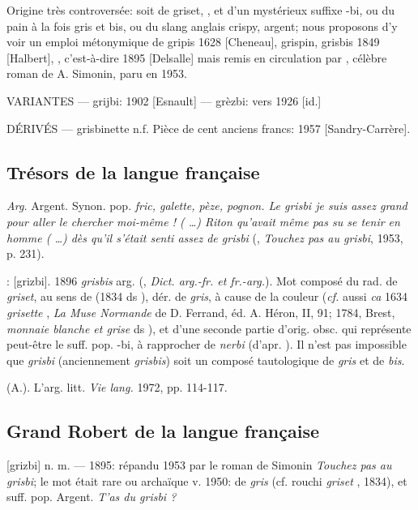 Origine très controversée: soit de griset, , et d'un mystérieux suffixe -bi, ou du pain à la fois gris et bis, ou du slang anglais crispy, argent; nous proposons d'y voir un emploi métonymique de gripis 1628 [Cheneau], grispin, grisbis 1849 [Halbert], , c'est-à-dire  1895 [Delsalle] mais remis en circulation par , célèbre roman de A. Simonin, paru en 1953.

VARIANTES ---  grijbi: 1902 [Esnault] --- grèzbi: vers 1926 [id.]

DÉRIVÉS --- grisbinette n.f. Pièce de cent anciens francs: 1957
[Sandry-Carrère].


\subsection*{Trésors de la langue française}

\emph{Arg.} Argent. Synon. pop. \emph{fric, galette, pèze, pognon. Le grisbi je suis assez grand pour aller le chercher moi-même ! (  \ldots ) Riton qu'avait même pas su se tenir en homme (  \ldots ) dès qu'il s'était senti assez de grisbi} (, \emph{Touchez pas au grisbi}, 1953, p. 231).

: [grizbi].   1896 \emph{grisbis}
arg.  (, \emph{Dict. arg.-fr. et fr.-arg.}). Mot composé du rad. de \emph{griset}, au sens de  (1834 ds ), dér. de \emph{gris}, à cause de la couleur (\emph{cf.} aussi \emph{ca} 1634 \emph{grisette} , \emph{La Muse Normande} de D. Ferrand, éd. A. Héron, II, 91; 1784, Brest, \emph{monnaie blanche et grise} ds ), et d'une seconde partie d'orig. obsc. qui représente peut-être le suff. pop. -bi, à rapprocher de \emph{nerbi}  (d'apr. ). Il n'est pas impossible que \emph{grisbi} (anciennement \emph{grisbis}) soit un composé tautologique de \emph{gris} et de \emph{bis}.

	  (A.). L'arg. litt. \emph{Vie lang.} 1972, pp. 114-117.


\subsection*{Grand Robert de la langue française}

[grizbi] n. m. --- 1895: répandu 1953 par le roman de Simonin \emph{Touchez pas au grisbi}; le mot était rare ou archaïque v. 1950: de \emph{gris}  (cf. rouchi \emph{griset} , 1834), et suff. pop.  Argent. \emph{T'as du grisbi ?}

